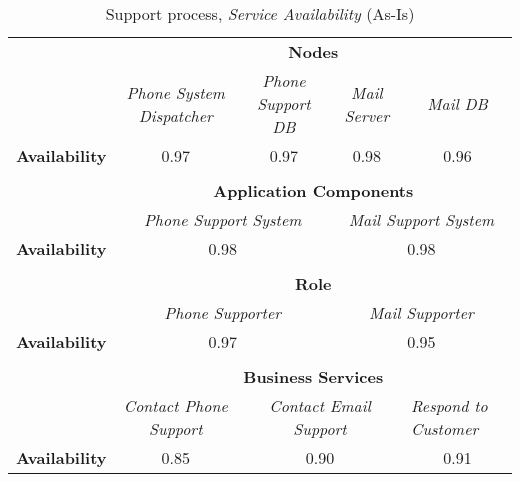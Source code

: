 \begin{table}[H]
	\centering
	\begin{tabular}{|c|c|p{2.5cm}|p{2.5cm}|p{2.5cm}|p{2.5cm}|}

		\cline{3-6}

		\multicolumn{2}{c}{} & \multicolumn{4}{|c|}{\textbf{Nodes}} \\ \cline{3-6}
		\multicolumn{2}{c|}{} & \multicolumn{1}{|c|}{\textsl{Phone System Dispatcher}} & \multicolumn{1}{|c|}{\textsl{Phone Support DB}} & \multicolumn{1}{|c|}{\textsl{Mail Server}} &\multicolumn{1}{|c|}{\textsl{Mail DB}} \\ \hline
		\multicolumn{2}{|c|}{\textbf{Availability}} & \multicolumn{1}{|c|}{0.97} & \multicolumn{1}{|c|}{0.97} & \multicolumn{1}{|c|}{0.98} & \multicolumn{1}{|c|}{0.96} \\  \hline

		\multicolumn{6}{c}{} \\ \cline{3-6}							
		\multicolumn{2}{c}{} & \multicolumn{4}{|c|}{\textbf{Application Components}} \\ \cline{3-6}
		\multicolumn{2}{c|}{} & \multicolumn{2}{c|}{\textsl{Phone Support System}} & \multicolumn{2}{c|}{\textsl{Mail Support System}} \\
		\hline
		\multicolumn{2}{|c|}{\textbf{Availability}} & \multicolumn{2}{c|}{0.98} & \multicolumn{2}{c|}{0.98} \\ \hline

	   \multicolumn{6}{c}{} \\ \cline{3-6}
		\multicolumn{2}{c}{} & \multicolumn{4}{|c|}{\textbf{Role}} \\ \cline{3-6}
		\multicolumn{2}{c|}{} & \multicolumn{2}{|c|}{\textsl{Phone Supporter}} & \multicolumn{2}{|c|}{\textsl{Mail Supporter}}\\ \hline
		\multicolumn{2}{|c|}{\textbf{Availability}}& \multicolumn{2}{|c|}{0.97} & \multicolumn{2}{|c|}{0.95}\\  \hline
		
		\multicolumn{6}{c}{} \\ \cline{3-6}
		\multicolumn{2}{c}{} & \multicolumn{4}{|c|}{\textbf{Business Services}} \\ \cline{3-6}
		\multicolumn{2}{c|}{} & \multicolumn{1}{|c|}{\textsl{Contact Phone Support}} & \multicolumn{2}{|c|}{\textsl{Contact Email Support}} & \multicolumn{1}{|p{2cm}|}{\textsl{Respond to Customer}}\\ \hline
		\multicolumn{2}{|c|}{\textbf{Availability}}& \multicolumn{1}{|c|}{0.85} & \multicolumn{2}{|c|}{0.90} & \multicolumn{1}{|c|}{0.91}\\ \hline
	\end{tabular}
\caption{Support process, \textsl{Service Availability} (As-Is)} 
\label{tab:support_as_is}
\end{table}